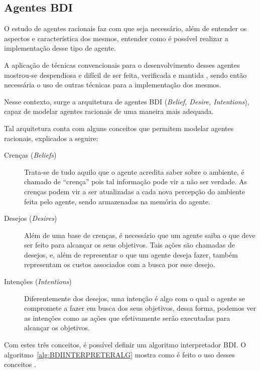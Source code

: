 \subsection{Agentes BDI}
O estudo de agentes racionais faz com que seja necessário, além de entender os
aspectos e característica dos mesmos, entender como é possível realizar a
implementação desse tipo de agente.

A aplicação de técnicas convencionais para o desenvolvimento desses agentes
mostrou-se despendiosa e difícil de ser feita, verificada e mantida
\cite{BDIFROMTHEORYTOPRACTICE}, sendo então necessária o uso de outras técnicas
para a implementação dos mesmos.

Nesse contexto, surge a arquitetura de agentes BDI (\textit{Belief, Desire,
Intentions}), capaz de modelar agentes racionais de uma maneira mais adequada.

Tal arquitetura conta com alguns conceitos que permitem modelar agentes
racionais, explicados a seguire:

\begin{description}
    \item [Crenças (\textit{Beliefs})]
        Trata-se de tudo aquilo que o agente acredita saber sobre o ambiente,
        é chamado de ``crença'' pois tal informação pode vir a não ser verdade.
        As crenças podem vir a ser atualizadas a cada nova percepção do ambiente
        feita pelo agente, sendo armazenadas na memória do agente.
    \item [Desejos (\textit{Desires})]
        Além de uma base de crenças, é necessário que um agente saiba o que deve
        ser feito para alcançar os seus objetivos. Tais ações são chamadas de
        desejos, e, além de representar o que um agente deseja fazer, também
        representam os custos associados com a busca por esse desejo.
    \item [Intenções (\textit{Intentions})]
        Diferentemente dos desejos, uma intenção é algo com o qual o agente se
        compromete a fazer em busca dos seus objetivos, dessa forma, podemos ver
        as intenções como as ações que efetivamente serão executadas para
        alcançar os objetivos.
\end{description}

Com estes três conceitos, é possível definir um algoritmo interpretador
BDI. O algoritmo~\ref{alg:BDIINTERPRETERALG} mostra como é feito o uso desses
conceitos \cite{BDIFROMTHEORYTOPRACTICE}.


